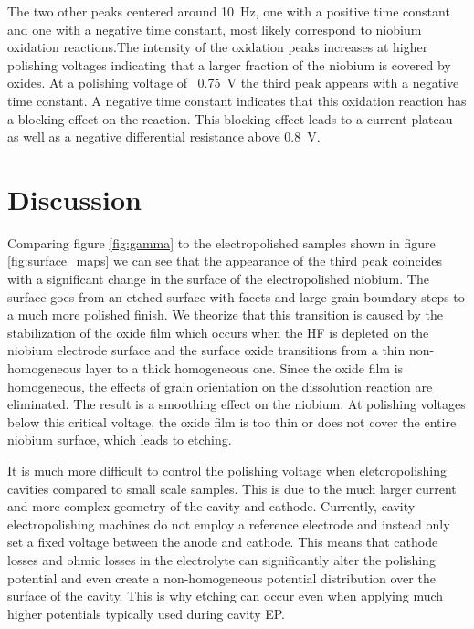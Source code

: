 \documentclass{revtex4-2}
\begin{document}
The two other peaks centered around \qty{10}{\hertz}, one with a positive time constant and one with a negative time constant, most likely correspond to niobium oxidation reactions.The intensity of the oxidation peaks increases at higher polishing voltages indicating that a larger fraction of the niobium is covered by oxides. At a polishing voltage of ~\qty{0.75}{\volt} the third peak appears with a negative time constant. A negative time constant indicates that this oxidation reaction has a blocking effect on the reaction. This blocking effect leads to a current plateau as well as a negative differential resistance above \qty{0.8}{\volt}.



\section{Discussion}

Comparing figure \ref{fig:gamma} to the electropolished samples shown in figure \ref{fig:surface_maps} we can see that the appearance of the third peak coincides with a significant change in the surface of the electropolished niobium. The surface goes from an etched surface with facets and large grain boundary steps to a much more polished finish. We theorize that this transition is caused by the stabilization of the oxide film which occurs when the HF is depleted on the niobium electrode surface and the surface oxide transitions from a thin non-homogeneous layer to a thick homogeneous one. Since the oxide film is homogeneous, the effects of grain orientation on the dissolution reaction are eliminated. The result is a smoothing effect on the niobium. At polishing voltages below this critical voltage, the oxide film is too thin or does not cover the entire niobium surface, which leads to etching.

It is much more difficult to control the polishing voltage when eletcropolishing cavities compared to small scale samples. This is due to the much larger current and more complex geometry of the cavity and cathode. Currently, cavity electropolishing machines do not employ a reference electrode and instead only set a fixed voltage between the anode and cathode. This means that cathode losses and ohmic losses in the electrolyte can significantly alter the polishing potential and even create a non-homogeneous potential distribution over the surface of the cavity. This is why etching can occur even when applying much higher potentials typically used during cavity EP.
\end{document}
